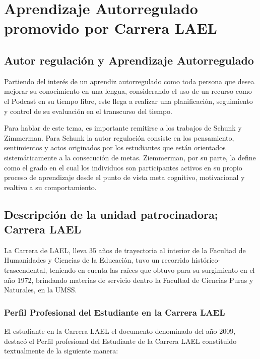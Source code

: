 \chapter{Aprendizaje Autorregulado promovido por Carrera LAEL}

\section{Autor regulación y Aprendizaje Autorregulado}

Partiendo del interés de un aprendiz autorregulado como toda persona que desea
mejorar su conocimiento en una lengua, considerando el uso de un recurso como
el Podcast en su tiempo libre, este llega a realizar una planificación,
seguimiento y control de su evaluación en el transcurso del tiempo.

Para hablar de este tema, es importante remitirse a los trabajos de Schunk y
Zimmerman. Para Schunk la autor regulación consiste en los pensamiento,
sentimientos y actos originados por los estudiantes que están orientados
sistemáticamente a la consecución de metas. Ziemmerman, por su parte, la define
como el grado en el cual los individuos son participantes activos en su propio
proceso de aprendizaje desde el punto de vista meta cognitivo, motivacional y
realtivo a su comportamiento. \cite{rinconconsideraciones}

\section{Descripción de la unidad patrocinadora; Carrera LAEL}

La Carrera de LAEL, lleva 35 años de trayectoria al interior de la Facultad de
Humanidades y Ciencias de la Educación, tuvo un recorrido histórico-
trascendental, teniendo en cuenta las raíces que obtuvo para su surgimiento en
el año 1972, brindando materias de servicio dentro la Facultad de Ciencias
Puras y Naturales, en la UMSS. \cite{CMNPZ2014}

\subsection{Perfil Profesional del Estudiante en la Carrera LAEL}

El estudiante en la Carrera LAEL el documento denominado  del año 2009, destacó el Perfil
profesional del Estudiante de la Carrera LAEL constituido textualmente de la
siguiente manera:

